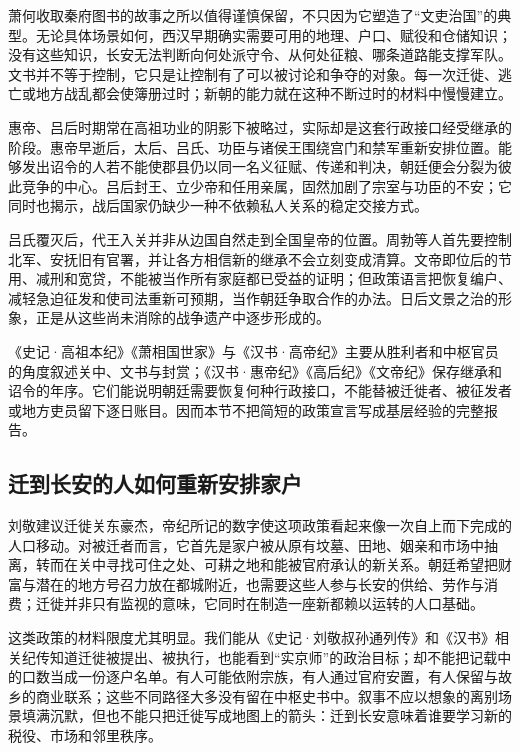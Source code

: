 萧何收取秦府图书的故事之所以值得谨慎保留，不只因为它塑造了“文吏治国”的典型。无论具体场景如何，西汉早期确实需要可用的地理、户口、赋役和仓储知识；没有这些知识，长安无法判断向何处派守令、从何处征粮、哪条道路能支撑军队。文书并不等于控制，它只是让控制有了可以被讨论和争夺的对象。每一次迁徙、逃亡或地方战乱都会使簿册过时；新朝的能力就在这种不断过时的材料中慢慢建立。

惠帝、吕后时期常在高祖功业的阴影下被略过，实际却是这套行政接口经受继承的阶段。惠帝早逝后，太后、吕氏、功臣与诸侯王围绕宫门和禁军重新安排位置。能够发出诏令的人若不能使郡县仍以同一名义征赋、传递和判决，朝廷便会分裂为彼此竞争的中心。吕后封王、立少帝和任用亲属，固然加剧了宗室与功臣的不安；它同时也揭示，战后国家仍缺少一种不依赖私人关系的稳定交接方式。

吕氏覆灭后，代王入关并非从边国自然走到全国皇帝的位置。周勃等人首先要控制北军、安抚旧有官署，并让各方相信新的继承不会立刻变成清算。文帝即位后的节用、减刑和宽贷，不能被当作所有家庭都已受益的证明；但政策语言把恢复编户、减轻急迫征发和使司法重新可预期，当作朝廷争取合作的办法。日后文景之治的形象，正是从这些尚未消除的战争遗产中逐步形成的。

\begin{sourcenote}[谁留下了战后恢复的记录]
《史记·高祖本纪》《萧相国世家》与《汉书·高帝纪》主要从胜利者和中枢官员的角度叙述关中、文书与封赏；《汉书·惠帝纪》《高后纪》《文帝纪》保存继承和诏令的年序。它们能说明朝廷需要恢复何种行政接口，不能替被迁徙者、被征发者或地方吏员留下逐日账目。因而本节不把简短的政策宣言写成基层经验的完整报告。
\end{sourcenote}

\subsection{迁到长安的人如何重新安排家户}

刘敬建议迁徙关东豪杰，帝纪所记的数字使这项政策看起来像一次自上而下完成的人口移动。对被迁者而言，它首先是家户被从原有坟墓、田地、姻亲和市场中抽离，转而在关中寻找可住之处、可耕之地和能被官府承认的新关系。朝廷希望把财富与潜在的地方号召力放在都城附近，也需要这些人参与长安的供给、劳作与消费；迁徙并非只有监视的意味，它同时在制造一座新都赖以运转的人口基础。

这类政策的材料限度尤其明显。我们能从《史记·刘敬叔孙通列传》和《汉书》相关纪传知道迁徙被提出、被执行，也能看到“实京师”的政治目标；却不能把记载中的口数当成一份逐户名单。有人可能依附宗族，有人通过官府安置，有人保留与故乡的商业联系；这些不同路径大多没有留在中枢史书中。叙事不应以想象的离别场景填满沉默，但也不能只把迁徙写成地图上的箭头：迁到长安意味着谁要学习新的税役、市场和邻里秩序。

